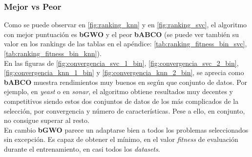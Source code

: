\subsubsection{Mejor vs Peor}
Como se puede observar en \ref{fig:ranking_knn} y en \ref{fig:ranking_svc}, el algoritmo con mejor puntuación es \textbf{bGWO} y el peor \textbf{bABCO} (se puede ver también su valor en los rankings de las tablas en el apéndice: \ref{tab:ranking_fitness_bin_svc}, \ref{tab:ranking_fitness_bin_knn}). \\[6pt]
En las figuras de \ref{fig:convergencia_svc_1_bin}, \ref{fig:convergencia_svc_2_bin}, \ref{fig:convergencia_knn_1_bin} y \ref{fig:convergencia_knn_2_bin}, se aprecia como \textbf{bABCO} muestra rendimientos muy buenos en según que conjunto de datos. Por ejemplo, en \textit{yeast} o en \textit{sonar}, el algoritmo obtiene resultados muy decentes y competitivos siendo estos dos conjuntos de datos de los más complicados de la selección, por convergencia y número de características. Pese a ello, en conjunto, no consigue superar al resto.\\[6pt]
En cambio \textbf{bGWO} parece un adaptarse bien a todos los problemas seleccionados sin excepción. Es capaz de obtener el mínimo, en el valor \textit{fitness} de evaluación durante el entrenamiento, en casi todos los \textit{datasets}.

